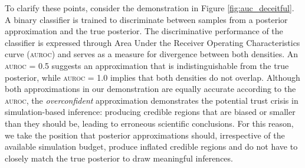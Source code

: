 \documentclass[twoside]{article}
\begin{document}
To clarify these points, consider the demonstration in Figure \ref{fig:auc_deceitful}.
A binary classifier is trained to discriminate between samples from a posterior approximation and the true posterior.
The discriminative performance of the classifier is expressed through Area Under the Receiver Operating Characteristics curve (\textsc{auroc}) and serves as a measure for divergence between both densities. An \textsc{auroc} = 0.5 suggests an approximation that is indistinguishable from the true posterior, while \textsc{auroc} = 1.0 implies that both densities do not overlap.
Although both approximations in our demonstration are equally accurate according to the \textsc{auroc}, the \emph{overconfident} approximation demonstrates the potential trust crisis in simulation-based inference:
producing credible regions that are biased or smaller than they should be, leading to erroneous scientific conclusions. 
For this reason, we take the position that posterior approximations should, irrespective of the available simulation budget, produce inflated credible regions and do not have to closely match the true posterior to draw meaningful inferences.
\end{document}
